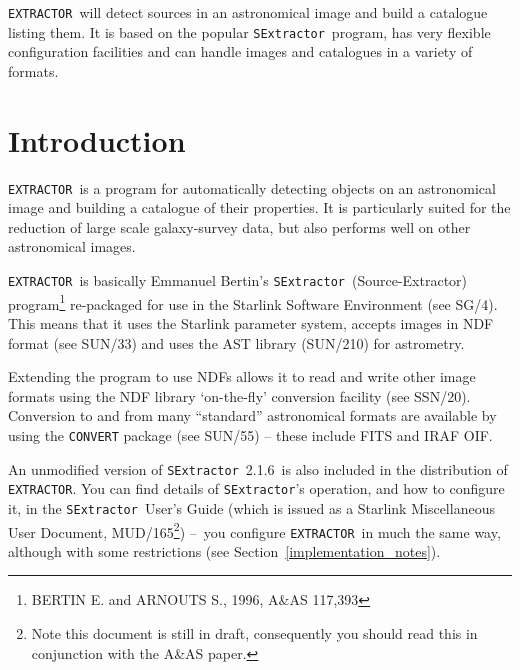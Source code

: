 \documentclass[twoside,11pt]{article}
\newcommand{\stardocinitials}  {SUN}
\newcommand{\stardocnumber}    {226.4}
\newcommand{\stardocabstract}  {\EXTRACTOR\ will detect sources in
an astronomical image and build a catalogue listing them. It is based on the
popular \SExtractor\ program, has very flexible configuration
facilities and can handle images and catalogues in a variety of formats.}
\newcommand{\sexversion}{2.1.6}
\newcommand{\stardocname}{\stardocinitials /\stardocnumber}
\newcommand{\htmladdnormallink}[2]{#1}
\newcommand{\htmlref}[2]{#1}
\newenvironment{latexonly}{}{}
\newcommand{\latex}[1]{#1}
\newcommand{\xref}[3]{#1}
\newcommand{\xlabel}[1]{}
\renewcommand{\_}{\texttt{\symbol{95}}}
\newcommand{\EXTRACTOR}{\texttt{EXTRACTOR}}
\newcommand{\CONVERT}{\texttt{CONVERT}}
\newcommand{\SExtractor}{\texttt{SExtractor}}
\newcommand{\IRAFURL}{http://www.starlink.rl.ac.uk/iraf/web/iraf-homepage.html}
\newcommand{\FITSURL}{http://fits.gsfc.nasa.gov/}
\newcommand{\MUD}{mud165.ps}
\newcommand{\dash}{--}
\newcommand{\dash}{-}
\renewcommand{\thepage}{\roman{page}}
\begin{document}
\stardocabstract
  \newpage
  \begin{latexonly}
    \setlength{\parskip}{0mm}
    \tableofcontents
    \setlength{\parskip}{\medskipamount}
    \markboth{\stardocname}{\stardocname}
  \end{latexonly}
\cleardoublepage
\renewcommand{\thepage}{\arabic{page}}
\setcounter{page}{1}

\section{\xlabel{introduction}Introduction}
\EXTRACTOR\ is a program for automatically detecting objects on an
astronomical image and building a catalogue of their properties. It is
particularly suited for the reduction of large scale galaxy-survey
data, but also performs well on other astronomical images.

\EXTRACTOR\ is basically Emmanuel Bertin's \SExtractor\
(Source-Extractor) program\footnote{BERTIN E. and ARNOUTS S., 1996,
A\&AS 117,393} re-packaged for use in the \xref{Starlink Software
Environment}{sg4}{}\latex{ (see SG/4)}.  This means that it uses the
Starlink parameter system, accepts images in
\xref{NDF}{sun33}{abstract} format \latex{(see SUN/33)} and uses the
\xref{AST}{sun210}{} library \latex{(SUN/210)} for astrometry.

Extending the program to use NDFs allows it to read and write other
image formats using the NDF library \xref{`on-the-fly' conversion
facility}{ssn20}{abstract} \latex{(see SSN/20)}.  Conversion to and
from many ``standard'' astronomical
\xref{formats}{sun55}{the_default_conversion_commands} are available
by using the \xref{\CONVERT}{sun55}{abstract} package \latex{(see
SUN/55)} -- these include \htmladdnormallink{FITS}{\FITSURL} and
\htmladdnormallink{IRAF}{\IRAFURL} OIF.

An unmodified version of \SExtractor\ \sexversion\ is also included in the
distribution of \EXTRACTOR.  You can find details of \SExtractor's
operation, and how to configure it, in the
\htmladdnormallink{\SExtractor\ User's Guide}{\MUD} (which is issued
as a Starlink Miscellaneous User Document, MUD/165\footnote{Note this
document is still in draft, consequently you should read this in
conjunction with the A\&AS paper.}) \dash\ you configure \EXTRACTOR\
in much the same way, although with
\htmlref{some restrictions}{implementation_notes}
\latex{(see Section~\ref{implementation_notes})}.
\end{document}
